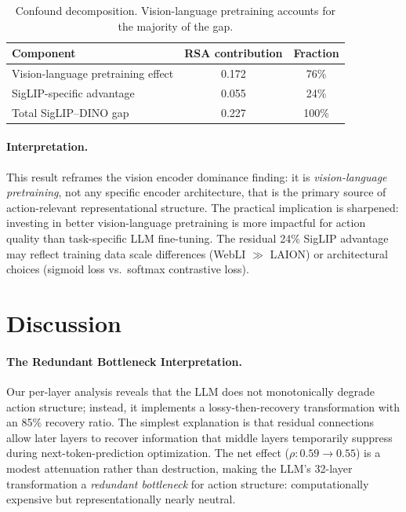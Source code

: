 \documentclass[letterpaper]{article}
\begin{document}
\begin{table}[t]
\centering
\caption{Confound decomposition. Vision-language pretraining accounts for the majority of the gap.}
\label{tab:confound}
\small
\begin{tabular}{lcc}
\toprule
\textbf{Component} & \textbf{RSA contribution} & \textbf{Fraction} \\
\midrule
Vision-language pretraining effect & 0.172 & 76\% \\
SigLIP-specific advantage & 0.055 & 24\% \\
\midrule
Total SigLIP--DINO gap & 0.227 & 100\% \\
\bottomrule
\end{tabular}
\end{table}

\paragraph{Interpretation.}
This result reframes the vision encoder dominance finding: it is \emph{vision-language pretraining}, not any specific encoder architecture, that is the primary source of action-relevant representational structure.
The practical implication is sharpened: investing in better vision-language pretraining is more impactful for action quality than task-specific LLM fine-tuning.
The residual 24\% SigLIP advantage may reflect training data scale differences (WebLI $\gg$ LAION) or architectural choices (sigmoid loss vs.\ softmax contrastive loss).


\section{Discussion}
\label{sec:discussion}

\paragraph{The Redundant Bottleneck Interpretation.}
Our per-layer analysis reveals that the LLM does not monotonically degrade action structure; instead, it implements a lossy-then-recovery transformation with an 85\% recovery ratio.
The simplest explanation is that residual connections allow later layers to recover information that middle layers temporarily suppress during next-token-prediction optimization.
The net effect ($\rho: 0.59\to0.55$) is a modest attenuation rather than destruction, making the LLM's 32-layer transformation a \emph{redundant bottleneck} for action structure: computationally expensive but representationally nearly neutral.
\end{document}
